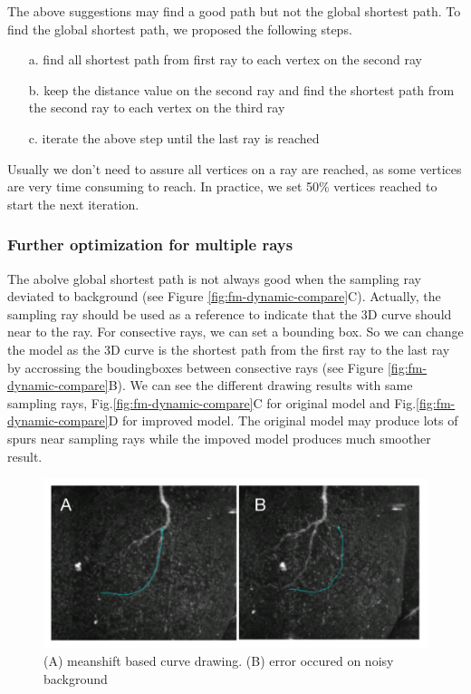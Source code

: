 The above suggestions may find a good path but not the global shortest path. To find the global shortest path, we proposed the following steps.
\begin{itemize}
\item[a.] find all shortest path from first ray to each vertex on the second ray
\item[b.] keep the distance value on the second ray and find the shortest path from the second ray to each vertex on the third ray
\item[c.] iterate the above step until the last ray is reached
\end{itemize}

Usually we don't need to assure all vertices on a ray are reached, as some vertices are very time consuming to reach. In practice, we set 50\% vertices reached  to start the next iteration.
\subsubsection{Further optimization for multiple rays}
The abolve global shortest path is not always good when the sampling ray deviated to background (see Figure \ref{fig:fm-dynamic-compare}C). Actually, the sampling ray should be used as a reference to indicate that the 3D curve should near to the ray. For consective rays, we can set a bounding box. So we can change the model as the 3D curve is the shortest path from the first ray to the last ray by accrossing the boudingboxes between consective rays (see Figure \ref{fig:fm-dynamic-compare}B). We can see the different drawing results with same sampling rays, Fig.\ref{fig:fm-dynamic-compare}C for original model and Fig.\ref{fig:fm-dynamic-compare}D for improved model. The original model may produce lots of spurs near sampling rays while the impoved model produces much smoother result.

\begin{figure}[htb]
\begin{center}
\includegraphics[width=5in]{images/fm_meanshift_drawing}
\caption{(A) meanshift based curve drawing. (B) error occured on noisy background}
\label{fig:fm-meanshift-drawing} %
\end{center}
\end{figure}

